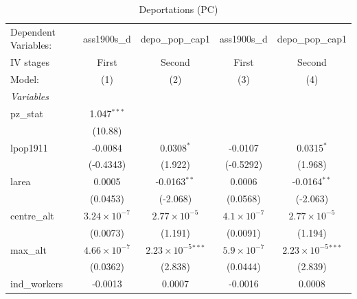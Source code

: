 
\begin{table}[htbp]
   \caption{Deportations (PC)}
   \centering
   \begin{tabular}{lcccc}
      \tabularnewline \midrule \midrule
      Dependent Variables:             & ass1900s\_d           & depo\_pop\_cap1               & ass1900s\_d          & depo\_pop\_cap1\\    
      IV stages                        & First                 & Second                        & First                & Second \\   
      Model:                           & (1)                   & (2)                           & (3)                  & (4)\\  
      \midrule
      \emph{Variables}\\
      pz\_stat                         & 1.047$^{***}$         &                               &                      &   \\   
                                       & (10.88)               &                               &                      &   \\   
      lpop1911                         & -0.0084               & 0.0308$^{*}$                  & -0.0107              & 0.0315$^{*}$\\   
                                       & (-0.4343)             & (1.922)                       & (-0.5292)            & (1.968)\\   
      larea                            & 0.0005                & -0.0163$^{**}$                & 0.0006               & -0.0164$^{**}$\\   
                                       & (0.0453)              & (-2.068)                      & (0.0568)             & (-2.063)\\   
      centre\_alt                      & $3.24\times 10^{-7}$  & $2.77\times 10^{-5}$          & $4.1\times 10^{-7}$  & $2.77\times 10^{-5}$\\    
                                       & (0.0073)              & (1.191)                       & (0.0091)             & (1.194)\\   
      max\_alt                         & $4.66\times 10^{-7}$  & $2.23\times 10^{-5}$$^{***}$  & $5.9\times 10^{-7}$  & $2.23\times 10^{-5}$$^{***}$\\    
                                       & (0.0362)              & (2.838)                       & (0.0444)             & (2.839)\\   
      ind\_workers                     & -0.0013               & 0.0007                        & -0.0016              & 0.0008\\   

\end{tabular}
\end{table}
